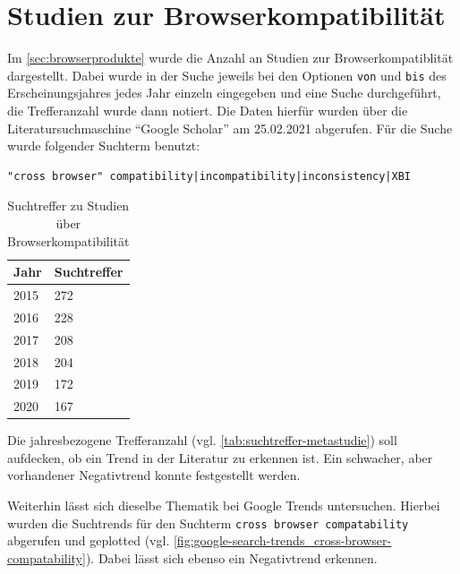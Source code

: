 \section{Studien zur Browserkompatibilität}
\label{sec:studien-zur-browser-kompatibilitaet}

Im \autoref{sec:browserprodukte} wurde die Anzahl an Studien zur Browserkompatiblität dargestellt. Dabei wurde in der Suche jeweils bei den Optionen \texttt{von} und \texttt{bis} des Erscheinungsjahres jedes Jahr einzeln eingegeben und eine Suche durchgeführt, die Trefferanzahl wurde dann notiert. Die Daten hierfür wurden über die Literatursuchmaschine \enquote{Google Scholar} am 25.02.2021 abgerufen. Für die Suche wurde folgender Suchterm benutzt:
\begin{verbatim}
"cross browser" compatibility|incompatibility|inconsistency|XBI
\end{verbatim}

\begin{table}
\centering
\vspace{-\baselineskip}
\begin{tabular}{|l|l|}
  \hline
  Jahr & Suchtreffer \\
  \hline
  2015 & 272 \\
  \hline
  2016 & 228 \\
  \hline
  2017 & 208 \\
  \hline
  2018 & 204 \\
  \hline
  2019 & 172 \\
  \hline
  2020 & 167 \\
  \hline
\end{tabular}
\caption{Suchtreffer zu Studien über Browserkompatibilität}
	\label{tab:suchtreffer-metastudie}
\end{table}

\def\lc{\left\lceil}   
\def\rc{\right\rceil}

Die jahresbezogene Trefferanzahl (vgl. \autoref{tab:suchtreffer-metastudie}) soll aufdecken, ob ein Trend in der Literatur zu erkennen ist. Ein schwacher, aber vorhandener Negativtrend konnte festgestellt werden.

Weiterhin lässt sich dieselbe Thematik bei Google Trends \cite{GoogleTrendsCrossBrowserCompatibility} untersuchen. Hierbei wurden die Suchtrends für den Suchterm \texttt{cross browser compatability} abgerufen und geplotted (vgl. \autoref{fig:google-search-trends_cross-browser-compatability}). Dabei lässt sich ebenso ein Negativtrend erkennen.

